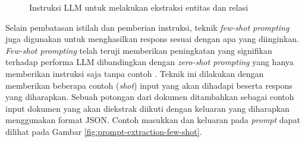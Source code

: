 \begin{figure}[H]
	\centering
	\caption{
		Instruksi LLM untuk melakukan ekstraksi entitas dan relasi
	}
	\label{fig:prompt-extraction-instruction}
\end{figure}

Selain pembatasan istilah dan pemberian instruksi, teknik \textit{few-shot prompting} juga digunakan untuk menghasilkan respons sesuai dengan apa yang diinginkan.
\textit{Few-shot prompting} telah teruji memberikan peningkatan yang signifikan terhadap performa LLM dibandingkan dengan \textit{zero-shot prompting} yang hanya memberikan instruksi saja tanpa contoh \cite{LLMisFewShot2020}.
Teknik ini dilakukan dengan memberikan beberapa contoh (\textit{shot}) input yang akan dihadapi beserta respons yang diharapkan.
Sebuah potongan dari dokumen ditambahkan sebagai contoh input dokumen yang akan diekstrak diikuti dengan keluaran yang diharapkan menggunakan format JSON.
Contoh masukkan dan keluaran pada \textit{prompt} dapat dilihat pada Gambar \ref{fig:prompt-extraction-few-shot}.

